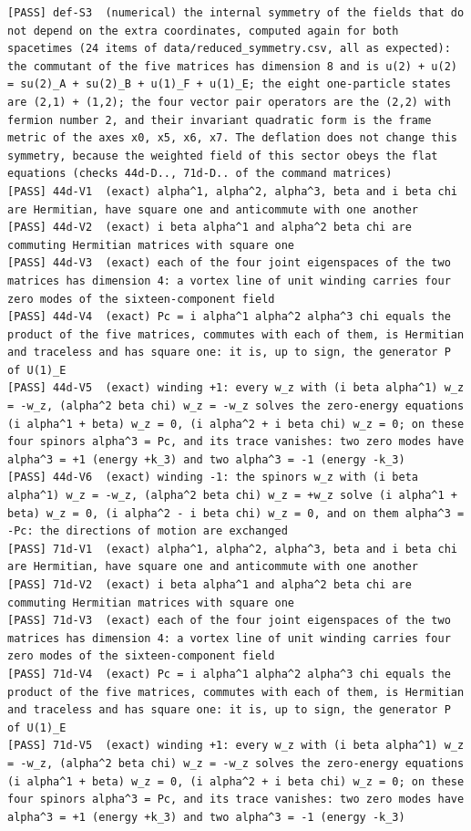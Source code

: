 \documentclass[
  10pt,
]{article}
\begin{document}
\begin{verbatim}
[PASS] def-S3  (numerical) the internal symmetry of the fields that do not depend on the extra coordinates, computed again for both spacetimes (24 items of data/reduced_symmetry.csv, all as expected): the commutant of the five matrices has dimension 8 and is u(2) + u(2) = su(2)_A + su(2)_B + u(1)_F + u(1)_E; the eight one-particle states are (2,1) + (1,2); the four vector pair operators are the (2,2) with fermion number 2, and their invariant quadratic form is the frame metric of the axes x0, x5, x6, x7. The deflation does not change this symmetry, because the weighted field of this sector obeys the flat equations (checks 44d-D.., 71d-D.. of the command matrices)
[PASS] 44d-V1  (exact) alpha^1, alpha^2, alpha^3, beta and i beta chi are Hermitian, have square one and anticommute with one another
[PASS] 44d-V2  (exact) i beta alpha^1 and alpha^2 beta chi are commuting Hermitian matrices with square one
[PASS] 44d-V3  (exact) each of the four joint eigenspaces of the two matrices has dimension 4: a vortex line of unit winding carries four zero modes of the sixteen-component field
[PASS] 44d-V4  (exact) Pc = i alpha^1 alpha^2 alpha^3 chi equals the product of the five matrices, commutes with each of them, is Hermitian and traceless and has square one: it is, up to sign, the generator P of U(1)_E
[PASS] 44d-V5  (exact) winding +1: every w_z with (i beta alpha^1) w_z = -w_z, (alpha^2 beta chi) w_z = -w_z solves the zero-energy equations (i alpha^1 + beta) w_z = 0, (i alpha^2 + i beta chi) w_z = 0; on these four spinors alpha^3 = Pc, and its trace vanishes: two zero modes have alpha^3 = +1 (energy +k_3) and two alpha^3 = -1 (energy -k_3)
[PASS] 44d-V6  (exact) winding -1: the spinors w_z with (i beta alpha^1) w_z = -w_z, (alpha^2 beta chi) w_z = +w_z solve (i alpha^1 + beta) w_z = 0, (i alpha^2 - i beta chi) w_z = 0, and on them alpha^3 = -Pc: the directions of motion are exchanged
[PASS] 71d-V1  (exact) alpha^1, alpha^2, alpha^3, beta and i beta chi are Hermitian, have square one and anticommute with one another
[PASS] 71d-V2  (exact) i beta alpha^1 and alpha^2 beta chi are commuting Hermitian matrices with square one
[PASS] 71d-V3  (exact) each of the four joint eigenspaces of the two matrices has dimension 4: a vortex line of unit winding carries four zero modes of the sixteen-component field
[PASS] 71d-V4  (exact) Pc = i alpha^1 alpha^2 alpha^3 chi equals the product of the five matrices, commutes with each of them, is Hermitian and traceless and has square one: it is, up to sign, the generator P of U(1)_E
[PASS] 71d-V5  (exact) winding +1: every w_z with (i beta alpha^1) w_z = -w_z, (alpha^2 beta chi) w_z = -w_z solves the zero-energy equations (i alpha^1 + beta) w_z = 0, (i alpha^2 + i beta chi) w_z = 0; on these four spinors alpha^3 = Pc, and its trace vanishes: two zero modes have alpha^3 = +1 (energy +k_3) and two alpha^3 = -1 (energy -k_3)

\end{verbatim}
\end{document}
